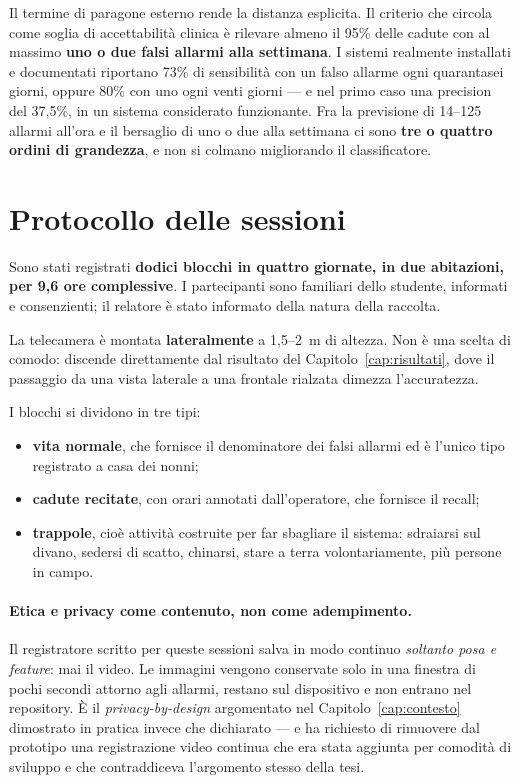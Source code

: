 Il termine di paragone esterno rende la distanza esplicita. Il criterio che circola come soglia di accettabilità clinica è rilevare almeno il 95\% delle cadute con al massimo \textbf{uno o due falsi allarmi alla settimana}. I sistemi realmente installati e documentati riportano 73\% di sensibilità con un falso allarme ogni quarantasei giorni, oppure 80\% con uno ogni venti giorni --- e nel primo caso una precision del 37,5\%, in un sistema considerato funzionante. Fra la previsione di 14--125 allarmi all'ora e il bersaglio di uno o due alla settimana ci sono \textbf{tre o quattro ordini di grandezza}, e non si colmano migliorando il classificatore.

\section{Protocollo delle sessioni}
\label{sec:protocollo-campo}

Sono stati registrati \textbf{dodici blocchi in quattro giornate, in due abitazioni, per 9,6 ore complessive}. I partecipanti sono familiari dello studente, informati e consenzienti; il relatore è stato informato della natura della raccolta.

La telecamera è montata \textbf{lateralmente} a 1,5--2~m di altezza. Non è una scelta di comodo: discende direttamente dal risultato del Capitolo~\ref{cap:risultati}, dove il passaggio da una vista laterale a una frontale rialzata dimezza l'accuratezza.

I blocchi si dividono in tre tipi:

\begin{itemize}
  \item \textbf{vita normale}, che fornisce il denominatore dei falsi allarmi ed è l'unico tipo registrato a casa dei nonni;
  \item \textbf{cadute recitate}, con orari annotati dall'operatore, che fornisce il recall;
  \item \textbf{trappole}, cioè attività costruite per far sbagliare il sistema: sdraiarsi sul divano, sedersi di scatto, chinarsi, stare a terra volontariamente, più persone in campo.
\end{itemize}

\paragraph{Etica e privacy come contenuto, non come adempimento.} Il registratore scritto per queste sessioni salva in modo continuo \emph{soltanto posa e feature}: mai il video. Le immagini vengono conservate solo in una finestra di pochi secondi attorno agli allarmi, restano sul dispositivo e non entrano nel repository. È il \emph{privacy-by-design} argomentato nel Capitolo~\ref{cap:contesto} dimostrato in pratica invece che dichiarato --- e ha richiesto di rimuovere dal prototipo una registrazione video continua che era stata aggiunta per comodità di sviluppo e che contraddiceva l'argomento stesso della tesi.

